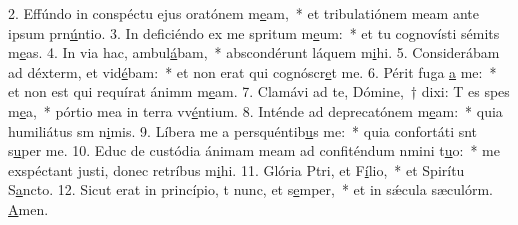 2. Effúndo in conspéctu ejus oratónem m\uline{e}am,~* et tribulatiónem meam ante ipsum prn\uline{ú}ntio.
3. In deficiéndo ex me spritum m\uline{e}um:~* et tu cognovísti sémits m\uline{e}as.
4. In via hac,  ambul\uline{á}bam,~* abscondérunt láquem m\uline{i}hi.
5. Considerábam ad déxterm, et vid\uline{é}bam:~* et non erat qui cognóscr\uline{e}t me.
6. Périt fuga \uline{a} me:~* et non est qui requírat ánimm m\uline{e}am.
7. Clamávi ad te, Dómine,~† dixi: T es spes m\uline{e}a,~* pórtio mea in terra vv\uline{é}ntium.
8. Inténde ad deprecatónem m\uline{e}am:~* quia humiliátus sm n\uline{i}mis.
9. Líbera me a persquéntib\uline{u}s me:~* quia confortáti snt s\uline{u}per me.
10. Educ de custódia ánimam meam ad confiténdum nmini t\uline{u}o:~* me exspéctant justi, donec retríbus m\uline{i}hi.
11. Glória Ptri, et F\uline{í}lio,~* et Spirítu S\uline{a}ncto.
12. Sicut erat in princípio, t nunc, et s\uline{e}mper,~* et in sǽcula sæculórm. \uline{A}men.
